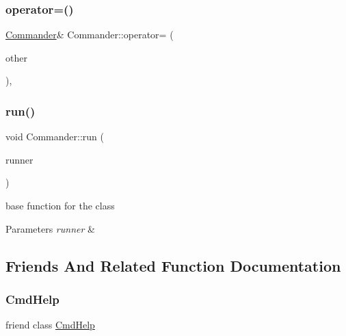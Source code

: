 \subsubsection{\texorpdfstring{operator=()}{operator=()}}
{\footnotesize\ttfamily \hyperlink{classCommander}{Commander}\& Commander\+::operator= (\begin{DoxyParamCaption}\item[{\hyperlink{classCommander}{Commander} const \&}]{other }\end{DoxyParamCaption})\hspace{0.3cm}{\ttfamily [private]}, {\ttfamily [delete]}}

\mbox{\label{classCommander_afea1bfe2bc8dbeea0d0523f369c9539e}} 
\subsubsection{\texorpdfstring{run()}{run()}}
{\footnotesize\ttfamily void Commander\+::run (\begin{DoxyParamCaption}\item[{\hyperlink{Command_8hpp_ad45c3de597c2023a8be0399d914161f4}{Runner\+Type} \&}]{runner }\end{DoxyParamCaption})\hspace{0.3cm}{\ttfamily [static]}}

base function for the class 
\begin{DoxyParams}{Parameters}
{\em runner} & \\
\hline
\end{DoxyParams}


\subsection{Friends And Related Function Documentation}
\mbox{\label{classCommander_aaf5700242631ebac67a8b2f6eaf9c730}} 
\subsubsection{\texorpdfstring{Cmd\+Help}{CmdHelp}}
{\footnotesize\ttfamily friend class \hyperlink{classCmdHelp}{Cmd\+Help}\hspace{0.3cm}{\ttfamily [friend]}}



